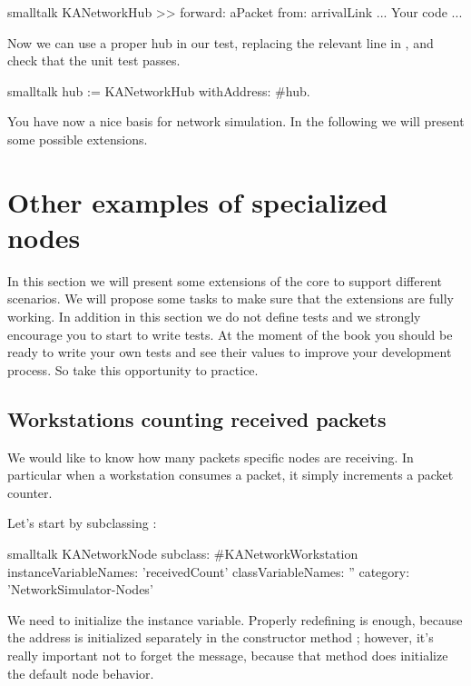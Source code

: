 \documentclass[10pt,twoside,english]{_support/latex/sbabook/sbabook}
\begin{document}
\begin{displaycode}{smalltalk}
KANetworkHub >> forward: aPacket from: arrivalLink
   ... Your code ...
\end{displaycode}

Now we can use a proper hub in our test, replacing the relevant line in , and check that the  unit test passes.

\begin{displaycode}{smalltalk}
    hub := KANetworkHub withAddress: #hub.
\end{displaycode}

You have now a nice basis for network simulation. In the following we will present some possible extensions. 
\section{Other examples of specialized nodes}
In this section we will present some extensions of the core to support different scenarios. We will propose some tasks to make sure that the extensions are fully working. In addition in this section we do not define tests and we strongly encourage you to start to write tests. At the moment of the book you should be ready to write your own tests and see their values to improve your development process. So take this opportunity to practice.
\subsection{Workstations counting received packets}
We would like to know how many packets specific nodes are receiving. 
In particular when a workstation consumes a packet, it simply increments a packet counter.

Let's start by subclassing :

\begin{displaycode}{smalltalk}
KANetworkNode subclass: #KANetworkWorkstation
    instanceVariableNames: 'receivedCount'
    classVariableNames: ''
    category: 'NetworkSimulator-Nodes'
\end{displaycode}

We need to initialize the  instance variable.
Properly redefining  is enough, because the address is initialized separately in the constructor method ; however, it's really important not to forget the  message, because that method does initialize the default node behavior.
\end{document}
